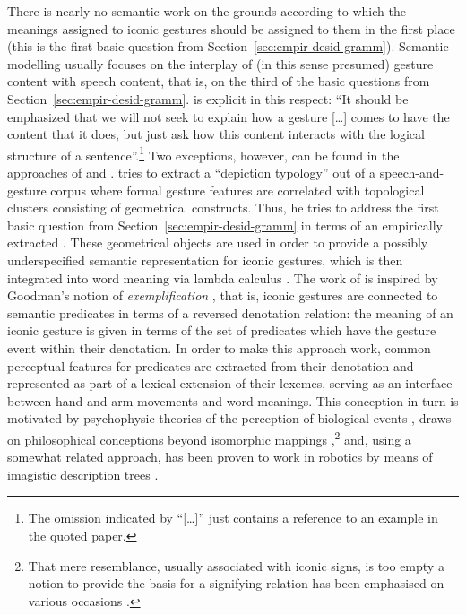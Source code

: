 \documentclass[output=paper
                ,modfonts
                ,nonflat
	        ,collection
	        ,collectionchapter
	        ,collectiontoclongg
 	        ,biblatex
                ,babelshorthands
                ,newtxmath
                ,draftmode
                ,colorlinks, citecolor=brown
]{./langsci/langscibook}
\begin{document}
 
There is nearly no semantic work on the grounds according to which the meanings assigned to iconic gestures should be assigned to them in the first place (this is the first basic question from Section~\ref{sec:empir-desid-gramm}).
%
Semantic modelling usually focuses on the interplay of (in this sense presumed) gesture content with speech content, that is, on the third of the basic questions from Section~\ref{sec:empir-desid-gramm}.
%
\citet[]{Schlenker:2018} is explicit in this respect: \enquote{It should be emphasized that we will not seek to explain how a gesture [\ldots] comes to have the content that it does, but just ask how this content interacts with the logical structure of a sentence}.\footnote{The omission indicated by \enquote{[\ldots]} just contains a reference to an example in the quoted paper.}
%
Two exceptions, however, can be found in the approaches of \citet{Rieser:2010} and \citet{Luecking:2013:a,Luecking:2016}.
%
\citet{Rieser:2010} tries to extract a \enquote{depiction typology} out of a speech-and-gesture corpus where formal gesture features are correlated with topological clusters consisting of geometrical constructs. 
%
Thus, he tries to address the first basic question from Section~\ref{sec:empir-desid-gramm} in terms of an empirically extracted .
%
These geometrical objects are used in order to provide a possibly underspecified semantic representation for iconic gestures, which is then integrated into word meaning via lambda calculus \citep{Hahn:Rieser:2010,Rieser:2011}.
%
The work of \citet{Luecking:2013:a,Luecking:2016} is inspired by Goodman's notion of \emph{exemplification} \citep{Goodman:1976}, that is, iconic gestures are connected to semantic predicates in terms of a reversed denotation relation: the meaning of an iconic gesture is given in terms of the set of predicates which have the gesture event within their denotation.
%
In order to make this approach work, common perceptual features for predicates are extracted from their denotation and represented as part of a lexical extension of their lexemes, serving as an interface between hand and arm movements and word meanings. 
%
This conception in turn is motivated by psychophysic theories of the perception of biological events \citep{Johansson:1973}, draws on philosophical  conceptions beyond isomorphic mappings \citep{Peacocke:1987},\footnote{\label{fn:resemblance}That mere resemblance, usually associated with iconic signs, is too empty a notion to provide the basis for a signifying relation has been emphasised on various occasions \citep{Burks:1949,Bierman:1962,Eco:1976,Goodman:1976,Sonesson:1998}.} and, using a somewhat related approach, has been proven to work in robotics by means of imagistic description trees \citep{Sowa:2006:a}.
\end{document}
